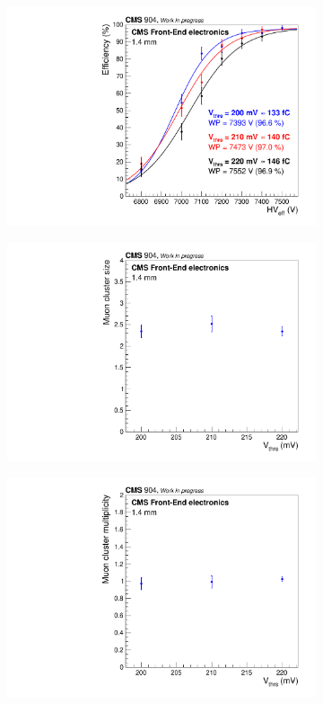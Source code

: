 	\begin{figure}[H]
		\begin{subfigure}{.5\linewidth}
		    \centering
			\includegraphics[width = .9\linewidth]{fig/chapt6/iRPC-CMS_FEB-muonEfficiency.pdf}
			\caption{\label{fig:iRPC_CMS_Result:A}}
		\end{subfigure}
		\begin{subfigure}{.5\linewidth}
		    \centering
			\includegraphics[width = .9\linewidth]{fig/chapt6/iRPC-CMS_FEB-thrs_CLS.pdf}
			\caption{\label{fig:iRPC_CMS_Result:B}}
		\end{subfigure}
		\begin{subfigure}{.5\linewidth}
		    \centering
			\includegraphics[width = .9\linewidth]{fig/chapt6/iRPC-CMS_FEB-thrs_CMP.pdf}

\end{subfigure}
\end{figure}
